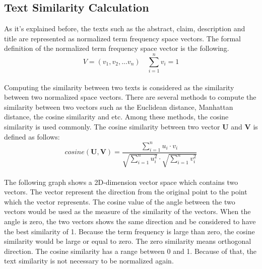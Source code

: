 \subsection{Text Similarity Calculation}
As it's explained before, the texts such as the abstract, claim, description and title are represented as normalized term frequency space vectors. The formal definition of the normalized term frequency space vector is the following.
\\
\begin{equation}
V=(v_1,v_2,...v_n) \quad  \sum_{i=1}^n v_i =1
\end{equation}
\\
Computing the similarity between two texts is considered as the similarity between two normalized space vectors. There are several methods to compute the similarity between two vectors such as the Euclidean distance, Manhattan distance, the cosine similarity and etc. Among these methods, the cosine similarity is used commonly. The cosine similarity between two vector $\textbf{U}$ and $\textbf{V}$ is defined as follows:
\\
\begin{equation}
cosine(\textbf{U},\textbf{V})= \frac{\sum_{i=1}^n u_i \cdot v_i}{\sqrt{\sum_{i=1}^n u_i^2} \cdot \sqrt{\sum_{i=1}^n v_i^2}}
\end{equation} 
\\
The following graph shows a 2D-dimension vector space which contains two vectors. The vector represent the direction from the original point to the point which the vector represents. The cosine value of the angle between the two vectors would be used as the measure of the similarity of the vectors. When the angle is zero, the two vectors shows the same direction and be considered to have the best similarity of 1. Because the term frequency is large than zero, the cosine similarity would be large or equal to zero. The zero similarity means orthogonal direction.
The cosine similarity has a range between 0 and 1. Because of that, the text similarity is not necessary to be normalized again.
\vspace{6pt}
